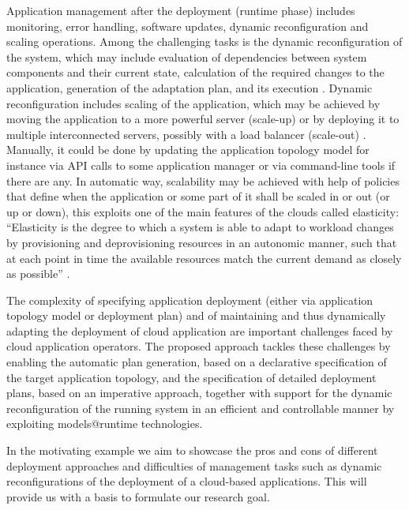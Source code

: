 \noindent 

\noindent Application management after the deployment (runtime phase) includes monitoring, error handling, software updates, dynamic reconfiguration and scaling operations. Among the challenging tasks is the dynamic reconfiguration of the system, which may include evaluation of dependencies between system components and their current state, calculation of the required changes to the application, generation of the adaptation plan, and its execution \cite{arshad2007deployment}. Dynamic reconfiguration includes scaling of the application, which may be achieved by moving the application to a more powerful server (scale-up) or by deploying it to multiple interconnected servers, possibly with a load balancer (scale-out) \cite{michael2007scale}. Manually, it could be done by updating the application topology model for instance via API calls to some application manager or via command-line tools if there are any. In automatic way, scalability may be achieved with help of policies that define when the application or some part of it shall be scaled in or out (or up or down), this exploits one of the main features of the clouds called elasticity: ``Elasticity is the degree to which a system is able to adapt to workload changes by provisioning and deprovisioning resources in an autonomic manner, such that at each point in time the available resources match the current demand as closely as possible'' \cite{herbst2013elasticity}. 

\noindent 

\noindent The complexity of specifying application deployment (either via application topology model or deployment plan) and of maintaining and thus dynamically adapting the deployment of cloud application are important challenges faced by cloud application operators. The proposed approach tackles these challenges by enabling the automatic plan generation, based on a declarative specification of the target application topology, and the specification of detailed deployment plans, based on an imperative approach, together with support for the dynamic reconfiguration of the running system in an efficient and controllable manner by exploiting models@runtime technologies.

\noindent 

\noindent In the motivating example we aim to showcase the pros and cons of different deployment approaches and difficulties of management tasks such as dynamic reconfigurations of the deployment of a cloud-based applications. This will provide us with a basis to formulate our research goal.

